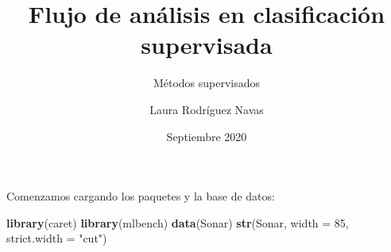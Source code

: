 \documentclass[
]{article}
\title{Flujo de análisis en clasificación supervisada}
\subtitle{Métodos supervisados}
\author{Laura Rodríguez Navas}
\date{Septiembre 2020}
\newenvironment{Shaded}{\begin{snugshade}}{\end{snugshade}}
\newcommand{\DataTypeTok}[1]{\textcolor[rgb]{0.13,0.29,0.53}{#1}}
\newcommand{\DecValTok}[1]{\textcolor[rgb]{0.00,0.00,0.81}{#1}}
\newcommand{\KeywordTok}[1]{\textcolor[rgb]{0.13,0.29,0.53}{\textbf{#1}}}
\newcommand{\NormalTok}[1]{#1}
\newcommand{\StringTok}[1]{\textcolor[rgb]{0.31,0.60,0.02}{#1}}
\begin{document}
\maketitle

{
\setcounter{tocdepth}{2}
\tableofcontents
}
Comenzamos cargando los paquetes y la base de datos:

\begin{Shaded}
\begin{Highlighting}[]
\KeywordTok{library}\NormalTok{(caret)}
\KeywordTok{library}\NormalTok{(mlbench)}
\KeywordTok{data}\NormalTok{(Sonar)}
\KeywordTok{str}\NormalTok{(Sonar, }\DataTypeTok{width =} \DecValTok{85}\NormalTok{, }\DataTypeTok{strict.width =} \StringTok{"cut"}\NormalTok{)}
\end{Highlighting}
\end{Shaded}
\end{document}
